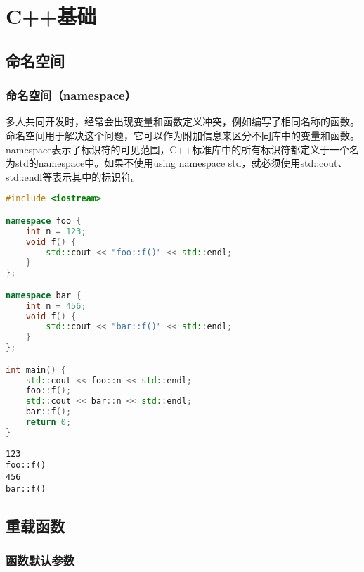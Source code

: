 \chapter{C++基础}

\section{命名空间}

\subsection{命名空间（namespace）}

多人共同开发时，经常会出现变量和函数定义冲突，例如编写了相同名称的函数。命名空间用于解决这个问题，它可以作为附加信息来区分不同库中的变量和函数。\\

namespace表示了标识符的可见范围，C++标准库中的所有标识符都定义于一个名为std的namespace中。如果不使用using namespace std，就必须使用std::cout、std::endl等表示其中的标识符。\\


\begin{lstlisting}[language=C++]
#include <iostream>

namespace foo {
    int n = 123;
    void f() {
        std::cout << "foo::f()" << std::endl;
    }
};

namespace bar {
    int n = 456;
    void f() {
        std::cout << "bar::f()" << std::endl;
    }
};

int main() {
    std::cout << foo::n << std::endl;
    foo::f();
    std::cout << bar::n << std::endl;
    bar::f();
    return 0;
}
\end{lstlisting}

\begin{tcolorbox}
	\begin{verbatim}
123
foo::f()
456
bar::f()
	\end{verbatim}
\end{tcolorbox}

\newpage

\section{重载函数}

\subsection{函数默认参数}

